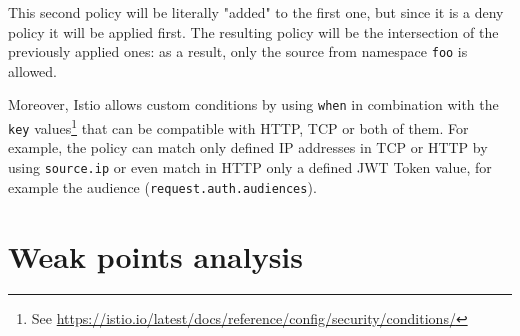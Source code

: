 \noindent This second policy will be literally "added" to the first one, but since it is a deny policy it will be applied first. The resulting policy will be the intersection of the previously applied ones: as a result, only the source from namespace \texttt{foo} is allowed. 

Moreover, Istio allows custom conditions by using \texttt{when} in combination with the \texttt{key} values\footnote{See \url{https://istio.io/latest/docs/reference/config/security/conditions/}} that can be compatible with HTTP, TCP or both of them. For example, the policy can match only defined IP addresses in TCP or HTTP by using \texttt{source.ip} or even match in HTTP only a defined JWT Token value, for example the audience (\texttt{request.auth.audiences}).

\section{Weak points analysis}